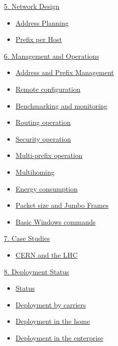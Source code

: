 \documentclass[
]{article}
\providecommand{\tightlist}{%
  \setlength{\itemsep}{0pt}\setlength{\parskip}{0pt}}
\begin{document}
\hyperref[network-design]{5. Network Design}

\begin{itemize}
\tightlist
\item
  \hyperref[address-planning]{Address Planning}
\item
  \hyperref[prefix-per-host]{Prefix per Host}
\end{itemize}

\hyperref[management-and-operations]{6. Management and Operations}

\begin{itemize}
\tightlist
\item
  \hyperref[address-and-prefix-management]{Address and Prefix
  Management}
\item
  \hyperref[remote-configuration]{Remote configuration}
\item
  \hyperref[benchmarking-and-monitoring]{Benchmarking and monitoring}
\item
  \hyperref[routing-operation]{Routing operation}
\item
  \hyperref[security-operation]{Security operation}
\item
  \hyperref[multi-prefix-operation]{Multi-prefix operation}
\item
  \hyperref[multihoming]{Multihoming}
\item
  \hyperref[energy-consumption]{Energy consumption}
\item
  \hyperref[packet-size-and-jumbo-frames]{Packet size and Jumbo Frames}
\item
  \hyperref[basic-windows-commands]{Basic Windows commands}
\end{itemize}

\hyperref[case-studies]{7. Case Studies}

\begin{itemize}
\tightlist
\item
  \hyperref[cern-and-the-lhc]{CERN and the LHC}
\end{itemize}

\hyperref[deployment-status]{8. Deployment Status}

\begin{itemize}
\tightlist
\item
  \hyperref[status]{Status}
\item
  \hyperref[deployment-by-carriers]{Deployment by carriers}
\item
  \hyperref[deployment-in-the-home]{Deployment in the home}
\item
  \hyperref[deployment-in-the-enterprise]{Deployment in the enterprise}
\end{itemize}
\end{document}
